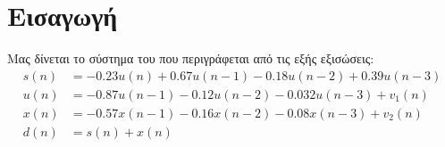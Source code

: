 \newcommand{\weiner}[1]{\mathbf{w}\left(#1\right)}
\newcommand{\Rmatrix}{\mathbf{R}}
\newcommand{\Pvector}{\mathbf{P}}
\section{Εισαγωγή}
Μας δίνεται το σύστημα του 
που περιγράφεται από τις εξής εξισώσεις:
\begin{align}
s(n) &= -0.23 u(n) + 0.67 u(n - 1) - 0.18 u(n - 2) + 0.39 u(n - 3)\label{eq:s}\\
u(n) &= -0.87 u(n - 1) - 0.12 u(n - 2) - 0.032 u(n - 3) + v_1(n)\label{eq:u}\\
x(n) &= -0.57 x(n - 1) - 0.16 x(n - 2) - 0.08 x(n - 3) + v_2(n)\label{eq:x}\\
d(n) &= s(n) + x(n)\label{eq:d}
\end{align}

